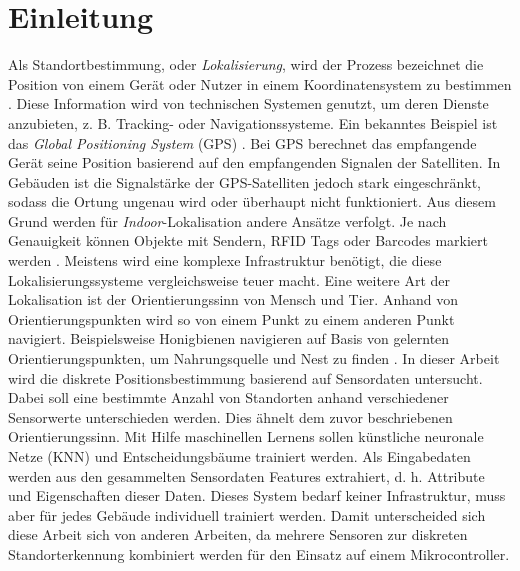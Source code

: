 \chapter{Einleitung}
Als Standortbestimmung, oder \textit{Lokalisierung}, wird der Prozess bezeichnet die Position von einem Gerät oder Nutzer in einem Koordinatensystem zu bestimmen \cite{bulusu2000gps}.
Diese Information wird von technischen Systemen genutzt, um deren Dienste anzubieten, z. B. Tracking- oder Navigationssysteme.
Ein bekanntes Beispiel ist das \textit{Global Positioning System} (GPS) \cite{kaplan2005understanding}.
Bei GPS berechnet das empfangende Gerät seine Position basierend auf den empfangenden Signalen der Satelliten.
\newline
\newline
In Gebäuden ist die Signalstärke der GPS-Satelliten jedoch stark eingeschränkt, sodass die Ortung ungenau wird oder überhaupt nicht funktioniert.
Aus diesem Grund werden für \textit{Indoor}-Lokalisation andere Ansätze verfolgt.
Je nach Genauigkeit können Objekte mit Sendern, RFID Tags oder Barcodes markiert werden \cite{xiao2016survey}.
Meistens wird eine komplexe Infrastruktur benötigt, die diese Lokalisierungssysteme vergleichsweise teuer macht.
\newline
\newline
Eine weitere Art der Lokalisation ist der Orientierungssinn von Mensch und Tier.
Anhand von Orientierungspunkten wird so von einem Punkt zu einem anderen Punkt navigiert.
Beispielsweise Honigbienen navigieren auf Basis von gelernten Orientierungspunkten, um Nahrungsquelle und Nest zu finden \cite{menzel1996knowledge}.
\newline
\newline
In dieser Arbeit wird die diskrete Positionsbestimmung basierend auf Sensordaten untersucht.
Dabei soll eine bestimmte Anzahl von Standorten anhand verschiedener Sensorwerte unterschieden werden.
Dies ähnelt dem zuvor beschriebenen Orientierungssinn.
Mit Hilfe maschinellen Lernens sollen künstliche neuronale Netze (KNN) und Entscheidungsbäume trainiert werden.
Als Eingabedaten werden aus den gesammelten Sensordaten Features extrahiert, d. h. Attribute und Eigenschaften dieser Daten.
Dieses System bedarf keiner Infrastruktur, muss aber für jedes Gebäude individuell trainiert werden.
Damit unterscheided sich diese Arbeit sich von anderen Arbeiten, da mehrere Sensoren zur diskreten Standorterkennung kombiniert werden für den Einsatz auf einem Mikrocontroller.
\newline
\newline
